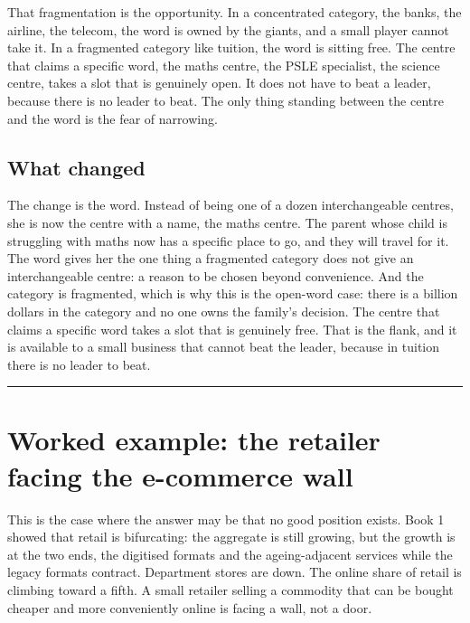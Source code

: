 \documentclass[10pt,twoside,openany]{memoir}
\newcommand{\needspacehead}{\needspace{4\baselineskip}}
\let\oldsection\section
\renewcommand{\section}{\needspacehead\oldsection}
\begin{document}
{That fragmentation is the opportunity. In a concentrated category, the
banks, the airline, the telecom, the word is owned by the giants, and a
small player cannot take it. In a fragmented category like tuition, the
word is sitting free. The centre that claims a specific word, the maths
centre, the PSLE specialist, the science centre, takes a slot that is
genuinely open. It does not have to beat a leader, because there is no
leader to beat. The only thing standing between the centre and the word
is the fear of narrowing.

\section{What changed}\label{what-changed-2}

The change is the word. Instead of being one of a dozen interchangeable
centres, she is now the centre with a name, the maths centre. The parent
whose child is struggling with maths now has a specific place to go, and
they will travel for it. The word gives her the one thing a fragmented
category does not give an interchangeable centre: a reason to be chosen
beyond convenience. And the category is fragmented, which is why this is
the open-word case: there is a billion dollars in the category and no
one owns the family's decision. The centre that claims a specific word
takes a slot that is genuinely free. That is the flank, and it is
available to a small business that cannot beat the leader, because in
tuition there is no leader to beat.

\begin{center}\rule{0.5\linewidth}{0.5pt}\end{center}

\FloatBarrier
\chapter{Worked example: the retailer facing the e-commerce
wall}\label{worked-example-the-retailer-facing-the-e-commerce-wall}

This is the case where the answer may be that no good position exists.
Book 1 showed that retail is bifurcating: the aggregate is still
growing, but the growth is at the two ends, the digitised formats and
the ageing-adjacent services while the legacy formats contract.
Department stores are down. The online share of retail is climbing
toward a fifth. A small retailer selling a commodity that can be bought
cheaper and more conveniently online is facing a wall, not a door.

}
\end{document}
